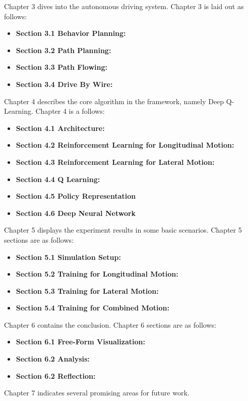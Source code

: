 Chapter 3 dives into the autonomous driving system. Chapter 3 is laid out as follows:

\begin{itemize}
\item \textbf {Section 3.1 Behavior Planning:} 
\item \textbf {Section 3.2 Path Planning:}
\item \textbf {Section 3.3 Path Flowing:}
\item \textbf {Section 3.4 Drive By Wire:} 
\end{itemize}

Chapter 4 describes the core algorithm in the framework, namely Deep Q-Learning. Chapter 4 is a follows:

\begin{itemize}
\item \textbf {Section 4.1 Architecture:} 
\item \textbf {Section 4.2 Reinforcement Learning for Longitudinal Motion:}
\item \textbf {Section 4.3 Reinforcement Learning for Lateral Motion:}
\item \textbf {Section 4.4 Q Learning:} 
\item \textbf {Section 4.5 Policy Representation}
\item \textbf {Section 4.6 Deep Neural Network}
\end{itemize}

Chapter 5 displays the experiment results in some basic scenarios. Chapter 5 sections are as follows:

\begin{itemize}
\item \textbf {Section 5.1 Simulation Setup:} 
\item \textbf {Section 5.2 Training for Longitudinal Motion:}
\item \textbf {Section 5.3 Training for Lateral Motion:}
\item \textbf {Section 5.4 Training for Combined Motion:} 
\end{itemize}

Chapter 6 contains the conclusion. Chapter 6 sections are as follows:

\begin{itemize}
\item \textbf {Section 6.1 Free-Form Visualization:} 
\item \textbf {Section 6.2 Analysis:} 
\item \textbf {Section 6.2 Reflection:} 
\end{itemize}

Chapter 7 indicates several promising areas for future work. 




%

\vfill

